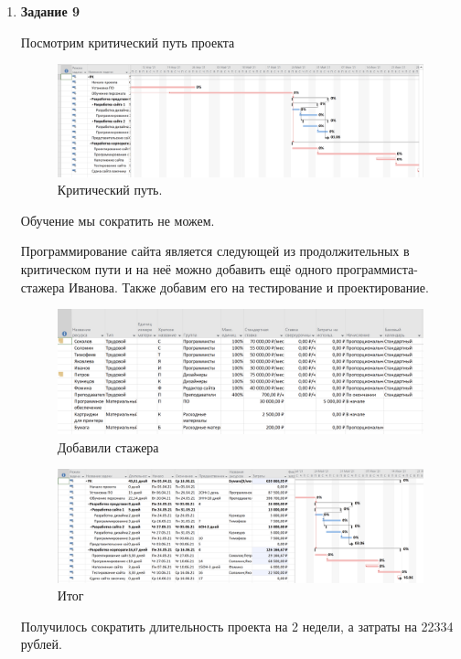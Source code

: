 \documentclass[a4paper,14pt]{extreport} %
\begin{document}
\begin{enumerate}
\item \textbf{Задание 9}

Посмотрим критический путь проекта

\begin{figure}[H]
  \centering
  \caption{Критический путь. }
  \includegraphics[scale=0.4]{16}
\end{figure}

Обучение мы сократить не можем. 

Программирование сайта является следующей из продолжительных в критическом пути и на неё можно добавить ещё одного программиста-стажера Иванова. Также добавим его на тестирование и проектирование. 

\begin{figure}[H]
  \centering
  \caption{Добавили стажера }
  \includegraphics[scale=0.5]{17}
\end{figure}

\begin{figure}[H]
  \centering
  \caption{Итог }
  \includegraphics[scale=0.5]{18}
\end{figure}

Получилось сократить длительность проекта на 2 недели, а затраты на 22334 рублей.


\end{enumerate}
\end{document}

